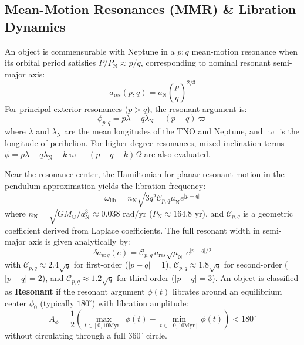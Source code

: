 \documentclass[11pt,a4paper]{article}
\begin{document}
\subsection{Mean-Motion Resonances (MMR) \& Libration Dynamics}
An object is commensurable with Neptune in a $p:q$ mean-motion resonance when its orbital period satisfies $P / P_{\text{N}} \approx p / q$, corresponding to nominal resonant semi-major axis:
\begin{equation}
a_{\text{res}}(p, q) = a_{\text{N}} \left(\frac{p}{q}\right)^{2/3}
\end{equation}
For principal exterior resonances ($p > q$), the resonant argument is:
\begin{equation}
\phi_{p:q} = p \lambda - q \lambda_{\text{N}} - (p - q) \varpi
\end{equation}
where $\lambda$ and $\lambda_{\text{N}}$ are the mean longitudes of the TNO and Neptune, and $\varpi$ is the longitude of perihelion. For higher-degree resonances, mixed inclination terms $\phi = p\lambda - q\lambda_{\text{N}} - k\varpi - (p-q-k)\Omega$ are also evaluated.

Near the resonance center, the Hamiltonian for planar resonant motion in the pendulum approximation yields the libration frequency:
\begin{equation}
\omega_{\text{lib}} = n_{\text{N}} \sqrt{3 q^2 \mathcal{C}_{p,q} \mu_{\text{N}} e^{|p-q|}}
\end{equation}
where $n_{\text{N}} = \sqrt{G M_\odot / a_{\text{N}}^3} \approx 0.038\text{ rad/yr}$ ($P_{\text{N}} \approx 164.8\text{ yr}$), and $\mathcal{C}_{p,q}$ is a geometric coefficient derived from Laplace coefficients. The full resonant width in semi-major axis is given analytically by:
\begin{equation}
\delta a_{p:q}(e) = \mathcal{C}_{p,q} \, a_{\text{res}} \sqrt{\mu_{\text{N}}} \, e^{|p-q|/2}
\end{equation}
with $\mathcal{C}_{p,q} \approx 2.4\sqrt{q}$ for first-order ($|p-q|=1$), $\mathcal{C}_{p,q} \approx 1.8\sqrt{q}$ for second-order ($|p-q|=2$), and $\mathcal{C}_{p,q} \approx 1.2\sqrt{q}$ for third-order ($|p-q|=3$). An object is classified as \textbf{Resonant} if the resonant argument $\phi(t)$ librates around an equilibrium center $\phi_0$ (typically $180^\circ$) with libration amplitude:
\begin{equation}
A_\phi = \frac{1}{2} \left( \max_{t\in[0, 10\text{Myr}]} \phi(t) - \min_{t\in[0, 10\text{Myr}]} \phi(t) \right) < 180^\circ
\end{equation}
without circulating through a full $360^\circ$ circle.
\end{document}
